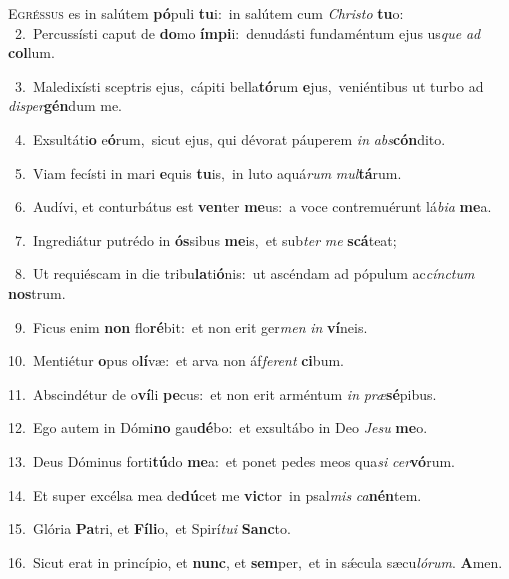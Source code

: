 \lettrine{\initial\textcolor{\initialcolor}{E}}{gréssus} es in salútem \textbf{pó}\-puli \textbf{tu}\-i:~\star in salútem cum \textit{Chris}\-\textit{to} \textbf{tu}\-o:\\
{\numbfont\textcolor{\numbcolor}{~2.}}~Percussísti caput de \textbf{do}\-mo \textbf{ím}\-\textbf{pi}i:~\star denudásti fundaméntum ejus us\textit{que} \textit{ad} \textbf{col}\-lum.\par
{\numbfont\textcolor{\numbcolor}{~3.}}~Maledixísti sceptris ejus,~\dagger cápiti bella\-\textbf{tó}\-rum \textbf{e}\-jus,~\star veniéntibus ut turbo ad \textit{di}\-\textit{sper}\textbf{gén}dum me.\par
{\numbfont\textcolor{\numbcolor}{~4.}}~Exsultáti\textbf{o} e\-\textbf{ó}\-rum,~\star sicut ejus, qui dévorat páuperem \textit{in} \textit{abs}\-\textbf{cón}dito.\par
{\numbfont\textcolor{\numbcolor}{~5.}}~Viam fecísti in mari \textbf{e}\-quis \textbf{tu}\-is,~\star in luto aquá\textit{rum} \textit{mul}\-\textbf{tá}rum.\par
{\numbfont\textcolor{\numbcolor}{~6.}}~Audívi, et conturbátus est \textbf{ven}\-ter \textbf{me}\-us:~\star a voce contremuérunt lá\-\textit{bi}\-\textit{a} \textbf{me}\-a.\par
{\numbfont\textcolor{\numbcolor}{~7.}}~Ingrediátur putrédo in \textbf{ós}\-sibus \textbf{me}\-is,~\star et sub\textit{ter} \textit{me} \textbf{scá}\-teat;\par
{\numbfont\textcolor{\numbcolor}{~8.}}~Ut requiéscam in die tribu\-\textbf{la}\-ti\-\textbf{ó}\-nis:~\star ut ascéndam ad pópulum ac\-\textit{cínc}\-\textit{tum} \textbf{nos}\-trum.\par
{\numbfont\textcolor{\numbcolor}{~9.}}~Ficus enim \textbf{non} flo\-\textbf{ré}\-bit:~\star et non erit ger\textit{men} \textit{in} \textbf{ví}\-neis.\par
{\numbfont\textcolor{\numbcolor}{10.}}~Mentiétur \textbf{o}\-pus o\-\textbf{lí}\-væ:~\star et arva non áf\-\textit{fe}\-\textit{rent} \textbf{ci}\-bum.\par
{\numbfont\textcolor{\numbcolor}{11.}}~Abscindétur de o\-\textbf{ví}\-li \textbf{pe}\-cus:~\star et non erit arméntum \textit{in} \textit{præ}\-\textbf{sé}pibus.\par
{\numbfont\textcolor{\numbcolor}{12.}}~Ego autem in Dómi\textbf{no} gau\-\textbf{dé}\-bo:~\star et exsultábo in Deo \textit{Je}\-\textit{su} \textbf{me}\-o.\par
{\numbfont\textcolor{\numbcolor}{13.}}~Deus Dóminus forti\-\textbf{tú}\-do \textbf{me}\-a:~\star et ponet pedes meos qua\textit{si} \textit{cer}\-\textbf{vó}rum.\par
{\numbfont\textcolor{\numbcolor}{14.}}~Et super excélsa mea de\-\textbf{dú}\-cet me \textbf{vic}\-tor~\star in psal\textit{mis} \textit{ca}\-\textbf{nén}tem.\par
{\numbfont\textcolor{\numbcolor}{15.}}~Glória \textbf{Pa}\-tri, et \textbf{Fí}\-\textbf{li}o,~\star et Spirí\-\textit{tu}\-\textit{i} \textbf{Sanc}\-to.\par
{\numbfont\textcolor{\numbcolor}{16.}}~Sicut erat in princípio, et \textbf{nunc}\-, et \textbf{sem}\-per,~\star et in sǽcula sæcu\-\textit{ló}\-\textit{rum}. \textbf{A}\-men.\par
